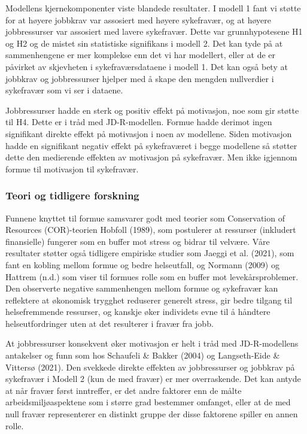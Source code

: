 \documentclass[
  12pt,
  a4paper,
  DIV=11,
  numbers=noendperiod]{scrartcl}
\begin{document}
Modellens kjernekomponenter viste blandede resultater. I modell 1 fant
vi støtte for at høyere jobbkrav var assosiert med høyere sykefravær, og
at høyere jobbressurser var assosiert med lavere sykefravær. Dette var
grunnhypotesene H1 og H2 og de mistet sin statistiske signifikans i
modell 2. Det kan tyde på at sammenhengene er mer komplekse enn det vi
har modellert, eller at de er påvirket av skjevheten i
sykefraværsdataene i modell 1. Det kan også bety at jobbkrav og
jobbressurser hjelper med å skape den mengden nullverdier i sykefravær
som vi ser i dataene.

Jobbressurser hadde en sterk og positiv effekt på motivasjon, noe som
gir støtte til H4. Dette er i tråd med JD-R-modellen. Formue hadde
derimot ingen signifikant direkte effekt på motivasjon i noen av
modellene. Siden motivasjon hadde en signifikant negativ effekt på
sykefraværet i begge modellene så støtter dette den medierende effekten
av motivasjon på sykefravær. Men ikke igjennom formue til motivasjon til
sykefravær.

\subsubsection{Teori og tidligere
forskning}\label{teori-og-tidligere-forskning}

Funnene knyttet til formue samsvarer godt med teorier som Conservation
of Resources (COR)-teorien Hobfoll (1989), som postulerer at ressurser
(inkludert finansielle) fungerer som en buffer mot stress og bidrar til
velvære. Våre resultater støtter også tidligere empiriske studier som
Jaeggi et al. (2021), som fant en kobling mellom formue og bedre
helseutfall, og Normann (2009) og Hattrem (n.d.) som viser til formues
rolle som en buffer mot levekårsproblemer. Den observerte negative
sammenhengen mellom formue og sykefravær kan reflektere at økonomisk
trygghet reduserer generelt stress, gir bedre tilgang til helsefremmende
ressurser, og kanskje øker individets evne til å håndtere
helseutfordringer uten at det resulterer i fravær fra jobb.

At jobbressurser konsekvent øker motivasjon er helt i tråd med
JD-R-modellens antakelser og funn som hos Schaufeli \& Bakker (2004) og
Langseth-Eide \& Vittersø (2021). Den svekkede direkte effekten av
jobbressurser og jobbkrav på sykefravær i Modell 2 (kun de med fravær)
er mer overraskende. Det kan antyde at når fravær først inntreffer, er
det andre faktorer enn de målte arbeidsmiljøaspektene som i større grad
bestemmer omfanget, eller at de med null fravær representerer en
distinkt gruppe der disse faktorene spiller en annen rolle.
\end{document}
